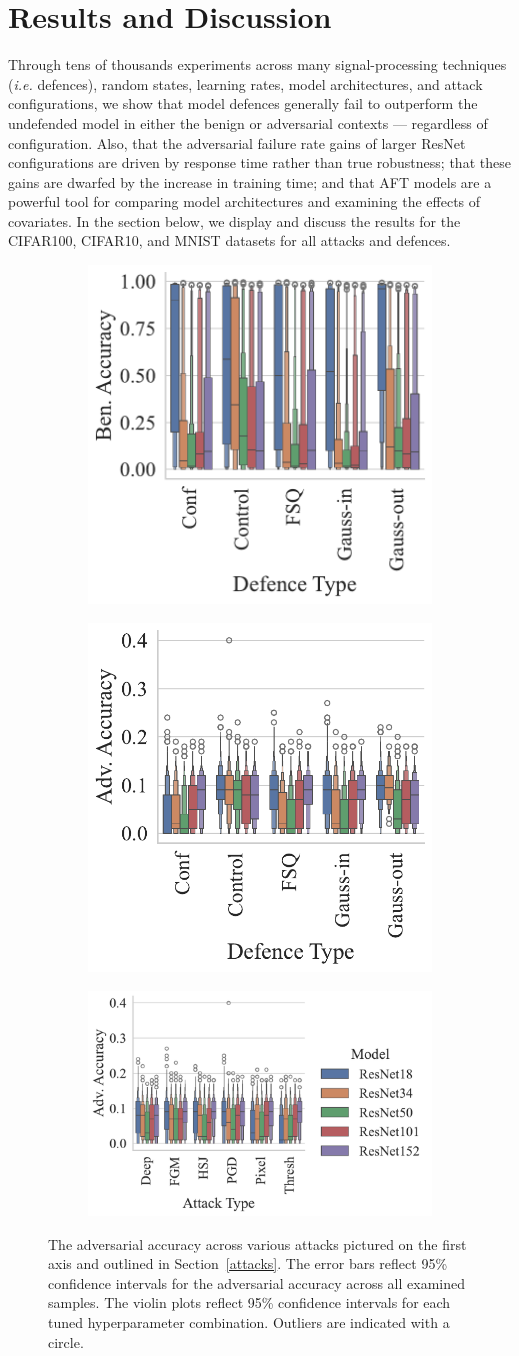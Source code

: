 \section{Results and Discussion}


Through tens of thousands experiments across many signal-processing techniques (\textit{i.e.} defences), random states, learning rates, model architectures, and attack configurations, we show that model defences generally fail to outperform the undefended model in either the benign or adversarial contexts --- regardless of configuration. Also, that the adversarial failure rate gains of larger ResNet configurations are driven by response time rather than true robustness; that these gains are dwarfed by the increase in training time; and that AFT models are a powerful tool for comparing model architectures and examining the effects of covariates. In the section below, we display and discuss the results for the CIFAR100, CIFAR10, and MNIST datasets for all attacks and defences.

\label{results}
\begin{figure}[!hbt]
\centering
\begin{subfigure}
    \centering
    \includegraphics[width=.26\textwidth]{plots/ben_accuracy_vs_defence_type.pdf}
\end{subfigure}
\begin{subfigure}
    \centering
    \includegraphics[width=.26\textwidth]{plots/adv_accuracy_vs_defence_type.pdf}
\end{subfigure}
\begin{subfigure}
    \centering
    \includegraphics[width=.40\textwidth]{plots/adv_accuracy_vs_attack_type.pdf}
\end{subfigure}
\caption{The adversarial accuracy across various attacks pictured on the first axis and outlined in Section~\ref{attacks}. The error bars reflect 95\% confidence intervals for the adversarial accuracy across all examined samples. The violin plots reflect 95\% confidence intervals for each tuned hyperparameter combination. Outliers are indicated with a circle.}
\label{fig:accuracies}
\end{figure}

